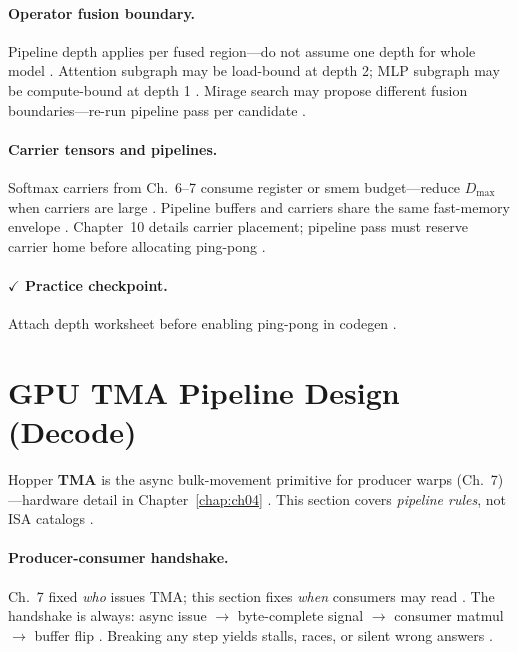 \paragraph{Operator fusion boundary.}
Pipeline depth applies per fused region---do not assume one depth for whole model \citep{yirage2026,wu2024mirage,dao2022flashattention}.
Attention subgraph may be load-bound at depth 2; MLP subgraph may be compute-bound at depth 1 \citep{shah2024flashattention3,patel2025llminference,memoryfloor2026}.
Mirage search may propose different fusion boundaries---re-run pipeline pass per candidate \citep{mpk2025,chen2020compilerbasedhardw,taxbreak2026}.

\paragraph{Carrier tensors and pipelines.}
Softmax carriers from Ch.~6--7 consume register or smem budget---reduce $D_{\max}$ when carriers are large \citep{dao2022flashattention,shah2024flashattention3,yirage2026}.
Pipeline buffers and carriers share the same fast-memory envelope \citep{memoryfloor2026,nvidia2022hopper,amd2024aie}.
Chapter~10 details carrier placement; pipeline pass must reserve carrier home before allocating ping-pong \citep{dao2022flashattention,patel2025llminference,chen2020compilerbasedhardw}.

\paragraph{$\checkmark$ Practice checkpoint.}
Attach depth worksheet before enabling ping-pong in codegen \citep{yirage2026,dao2022flashattention,chen2020compilerbasedhardw}.

\section{GPU TMA Pipeline Design (Decode)}
\label{sec:ch08_gpu_tma}

Hopper \textbf{TMA} is the async bulk-movement primitive for producer warps (Ch.~7)---hardware detail in Chapter~\ref{chap:ch04} \citep{nvidia2022hopper,semianalysis2024tma,shah2024flashattention3}.
This section covers \emph{pipeline rules}, not ISA catalogs \citep{yirage2026}.

\paragraph{Producer-consumer handshake.}
Ch.~7 fixed \emph{who} issues TMA; this section fixes \emph{when} consumers may read \citep{shah2024flashattention3,yirage2026,semianalysis2024tma}.
The handshake is always: async issue $\rightarrow$ byte-complete signal $\rightarrow$ consumer matmul $\rightarrow$ buffer flip \citep{nvidia2022hopper,dao2022flashattention}.
Breaking any step yields stalls, races, or silent wrong answers \citep{patel2025llminference,taxbreak2026,chen2020compilerbasedhardw}.

